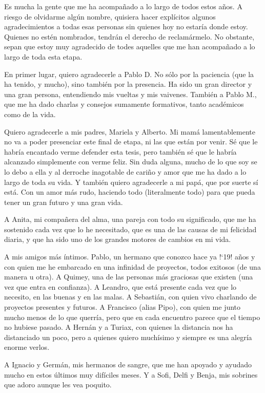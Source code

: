 Es mucha la gente que me ha acompañado a lo largo de todos estos
años. A riesgo de olvidarme algún nombre, quisiera hacer explícitos
algunos agradecimientos a todas esas personas sin quienes hoy no
estaría donde estoy. Quienes no estén nombrados, tendrán el derecho de
reclamármelo. No obstante, sepan que estoy muy agradecido de todes
aquelles que me han acompañado a lo largo de toda esta etapa.

En primer lugar, quiero agradecerle a Pablo D. No sólo por la
paciencia (que la ha tenido, y mucho), sino también por la
presencia. Ha sido un gran director y una gran persona, entendiendo
mis vueltas y mis vaivenes. También a Pablo M., que me ha dado charlas
y consejos sumamente formativos, tanto académicos como de la vida.

Quiero agradecerle a mis padres, Mariela y Alberto. Mi mamá
lamentablemente no va a poder presenciar este final de etapa, ni las
que están por venir. Sé que le habría encantado verme defender esta
tesis, pero también sé que le habría alcanzado simplemente con verme
feliz. Sin duda alguna, mucho de lo que soy se lo debo a ella y al
derroche inagotable de cariño y amor que me ha dado a lo largo de toda
su vida. Y también quiero agradecerle a mi papá, que por suerte sí
está. Con un amor más rudo, haciendo todo (literalmente todo) para que
pueda tener un gran futuro y una gran vida.

A Anita, mi compañera del alma, una pareja con todo su significado,
que me ha sostenido cada vez que lo he necesitado, que es una de las
causas de mi felicidad diaria, y que ha sido uno de los grandes
motores de cambios en mi vida.

A mis amigos más íntimos. Pablo, un hermano que conozco hace ya !`19!
años y con quien me he embarcado en una infinidad de proyectos, todos
exitosos (de una manera u otra).  A Quimey, una de las personas más
graciosas que existen (una vez que entra en confianza).  A Leandro,
que está presente cada vez que lo necesito, en las buenas y en las
malas.  A Sebastián, con quien vivo charlando de proyectos presentes y
futuros.  A Francisco (alias Pipo), con quien me junto mucho menos de
lo que querría, pero que en cada encuentro parece que el tiempo no
hubiese pasado.  A Hernán y a Turiax, con quienes la distancia nos ha
distanciado un poco, pero a quienes quiero muchísimo y siempre es una
alegría enorme verlos.

A Ignacio y Germán, mis hermanos de sangre, que me han apoyado y
ayudado mucho en estos últimos muy difíciles meses. Y a Sofi, Delfi y
Benja, mis sobrines que adoro aunque les vea poquito.

